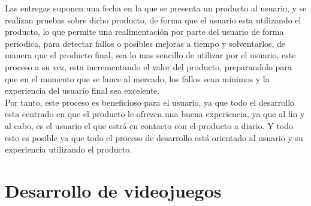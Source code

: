 Las entregas suponen una fecha en la que se presenta un producto al usuario, y se realizan pruebas sobre dicho producto, de forma que el usuario esta utilizando el producto, lo que permite una realimentación por parte del usuario de forma periodica, para detectar fallos o posibles mejoras a tiempo y solventarlos, de manera que el producto final, sea lo mas sencillo de utilizar por el usuario, este proceso a su vez, esta incrementando el valor del producto, preparandolo para que en el momento que se lance al mercado, los fallos sean mínimos y la experiencia del usuario final sea excelente.\\

Por tanto, este proceso es beneficioso para el usuario, ya que todo el desarrollo esta centrado en que el producto le ofrezca una buena experiencia, ya que al fin y al cabo, es el usuario el que estrá en contacto con el producto a diario. Y todo esto es posible ya que todo el proceso de desarrollo está orientado al usuario y su experiencia utilizando el producto.

\section{Desarrollo de videojuegos}
